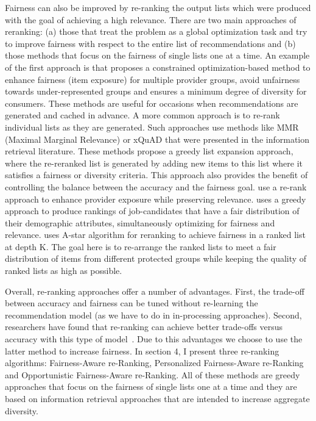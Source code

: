 Fairness can also be improved by re-ranking the output lists which were produced with the goal of achieving a high relevance. There are two main approaches of reranking: (a) those that treat the problem as a global optimization task and try to improve fairness with respect to the entire list of recommendations and (b) those methods that focus on the fairness of single lists one at a time.
An example of the first approach is \cite{surer2018multistakeholder} that proposes a constrained optimization-based method to enhance fairness (item exposure) for multiple provider groups, avoid unfairness towards under-represented groups and ensures a minimum degree of diversity for consumers. These methods are useful for occasions when recommendations are generated and cached in advance.
A more common approach is to re-rank individual lists as they are generated. Such approaches use methods like MMR (Maximal Marginal Relevance) \cite{carbonell1998use} or xQuAD \cite{santos2010explicit} that were presented in the information retrieval literature. These methods propose a greedy list expansion approach, where the re-reranked list is generated by adding new items to this list where it satisfies a fairness or diversity criteria. This approach also provides the benefit of controlling the balance between the accuracy and the fairness goal. 
\cite{modani2017fairness} use a re-rank approach to enhance provider exposure while preserving relevance. \cite{Geyik2019} uses a greedy approach to produce rankings of job-candidates that have a fair distribution of their demographic attributes, simultaneously optimizing for fairness and relevance. \cite{zehlike2017fa} uses A-star algorithm for reranking to achieve fairness in a ranked list at depth K. The goal here is to re-arrange the ranked lists to meet a fair distribution of items from different protected groups while keeping the quality of ranked lists as high as possible. 

Overall, re-ranking approaches offer a number of advantages. First, the trade-off between accuracy and fairness can be tuned without re-learning the recommendation model (as we have to do in in-processing approaches). Second, researchers have found that re-ranking can achieve better trade-offs versus accuracy with this type of model~\cite{abdollahpouri2019managing,liu2019personalized}. Due to this advantages we choose to use the latter method to increase fairness. In section 4, I present three re-ranking algorithms: Fairness-Aware re-Ranking, Personalized Fairness-Aware re-Ranking and Opportunistic Fairness-Aware re-Ranking. All of these methods are greedy approaches that focus on the fairness of single lists one at a time and they are based on information retrieval approaches that are intended to increase aggregate diversity.


